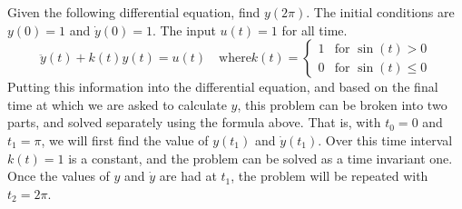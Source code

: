 \begin{example}
  Given the following differential equation, find $y(2\pi)$.
  The initial conditions are $y(0)=1$ and $\dot{y}(0)=1$.
  The input $u(t)=1$ for all time.
  \begin{equation*}
    \ddot{y}(t)+k(t)y(t)=u(t) \quad \text{where} k(t)=
    \begin{cases}
      1 & \text{for } \sin(t)>0\\
      0 & \text{for } \sin(t)\leq0
    \end{cases}
  \end{equation*}
  Putting this information into the differential equation, and based on the final time at which we are asked to calculate $y$, this problem can be broken into two parts, and solved separately using the formula above.
  That is, with $t_{0}=0$ and $t_{1}=\pi$, we will first find the value of $y(t_{1})$ and $\dot{y}(t_{1})$.
  Over this time interval $k(t)=1$ is a constant, and the problem can be solved as a time invariant one.
  Once the values of $y$ and $\dot{y}$ are had at $t_{1}$, the problem will be repeated with $t_{2}=2\pi$.


\end{example}
